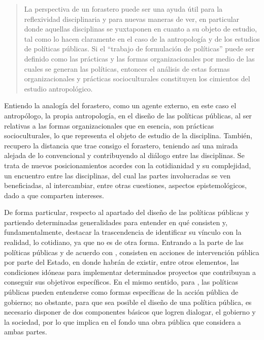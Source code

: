 \documentclass[
  spanish,
  11pt,
  a4paper,
]{scrbook}
\begin{document}
\begin{quote}
La perspectiva de un forastero puede ser una ayuda útil para la
reflexividad disciplinaria y para nuevas maneras de ver, en particular
donde aquellas disciplinas se yuxtaponen en cuanto a su objeto de
estudio, tal como lo hacen claramente en el caso de la antropología y de
los estudios de políticas públicas. Si el ``trabajo de formulación de
políticas'' puede ser definido como las prácticas y las formas
organizacionales por medio de las cuales se generan las políticas,
entonces el análisis de estas formas organizacionales y prácticas
socioculturales constituyen los cimientos del estudio antropológico.
\autocite[25]{Shore2010}
\end{quote}

Entiendo la analogía del forastero, como un agente externo, en este caso
el antropólogo, la propia antropología, en el diseño de las políticas
públicas, al ser relativas a las formas organizacionales que en esencia,
son prácticas socioculturales, lo que representa el objeto de estudio de
la disciplina. También, recupero la distancia que trae consigo el
forastero, teniendo así una mirada alejada de lo convencional y
contribuyendo al diálogo entre las disciplinas. Se trata de nuevos
posicionamientos acordes con la cotidianidad y su complejidad, un
encuentro entre las disciplinas, del cual las partes involucradas se ven
beneficiadas, al intercambiar, entre otras cuestiones, aspectos
epistemológicos, dado a que comparten intereses.

De forma particular, respecto al apartado del diseño de las políticas
públicas y partiendo determinadas generalidades para entender en qué
consisten y, fundamentalmente, destacar la trascendencia de identificar
su vínculo con la realidad, lo cotidiano, ya que no es de otra forma.
Entrando a la parte de las políticas públicas y de acuerdo con
\textcite{Roth2002}, consisten en acciones de intervención pública por
parte del Estado, en donde habrán de existir, entre otros elementos, las
condiciones idóneas para implementar determinados proyectos que
contribuyan a conseguir sus objetivos específicos. En el mismo sentido,
para \textcite{Aguilar2002}, las políticas públicas pueden entenderse
como formas específicas de la acción pública de gobierno; no obstante,
para que sea posible el diseño de una política pública, es necesario
disponer de dos componentes básicos que logren dialogar, el gobierno y
la sociedad, por lo que implica en el fondo una obra pública que
considera a ambas partes.
\end{document}
